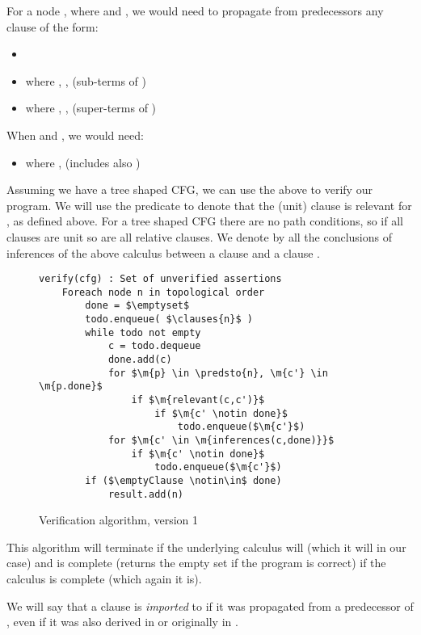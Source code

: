 For a node , where  and , we would need to propagate from predecessors any clause of the form:
\begin{itemize}
	\item {}
	\item {} where , ,     (sub-terms of )
	\item {} where , ,  (super-terms of )
\end{itemize}
When  and , we would need:
\begin{itemize}
	\item {} where ,  (includes also )
\end{itemize}

Assuming we have a tree shaped CFG, we can use the above to verify our program.
We will use the predicate  to denote that the (unit) clause  is relevant for , as defined above.
For a tree shaped CFG there are no path conditions, so if all clauses are unit so are all relative clauses.
We denote by  all the conclusions of inferences of the above calculus between a clause  and a clause .

\begin{figure}
\begin{lstlisting}
verify(cfg) : Set of unverified assertions
	Foreach node n in topological order
		done = $\emptyset$
		todo.enqueue( $\clauses{n}$ )
		while todo not empty
			c = todo.dequeue
			done.add(c)
			for $\m{p} \in \predsto{n}, \m{c'} \in \m{p.done}$
				if $\m{relevant(c,c')}$
					if $\m{c' \notin done}$
						todo.enqueue($\m{c'}$)
			for $\m{c' \in \m{inferences(c,done)}}$
				if $\m{c' \notin done}$
					todo.enqueue($\m{c'}$)
		if ($\emptyClause \notin\in$ done)
			result.add(n)
\end{lstlisting}
\caption{Verification algorithm, version 1}
\label{verification_algorithm_v1}
\end{figure}

This algorithm will terminate if the underlying calculus will (which it will in our case) and is complete (returns the empty set if the program is correct) if the calculus is complete (which again it is).

We will say that a clause is \emph{imported} to  if it was propagated from a predecessor of , 
even if it was also derived in  or originally in .

